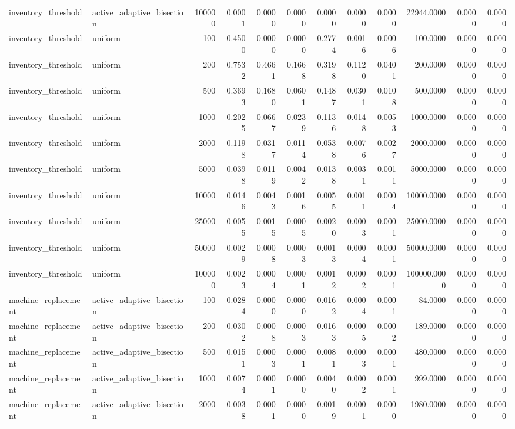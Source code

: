 \begin{tabular}{llrrrrrrrrrr}
inventory_threshold & active_adaptive_bisection & 100000 & 0.0001 & 0.0000 & 0.0000 & 0.0000 & 0.0000 & 0.0000 & 22944.0000 & 0.0000 & 0.0000 \\
inventory_threshold & uniform & 100 & 0.4500 & 0.0000 & 0.0000 & 0.2774 & 0.0016 & 0.0006 & 100.0000 & 0.0000 & 0.0000 \\
inventory_threshold & uniform & 200 & 0.7532 & 0.4661 & 0.1668 & 0.3198 & 0.1120 & 0.0401 & 200.0000 & 0.0000 & 0.0000 \\
inventory_threshold & uniform & 500 & 0.3693 & 0.1680 & 0.0601 & 0.1487 & 0.0301 & 0.0108 & 500.0000 & 0.0000 & 0.0000 \\
inventory_threshold & uniform & 1000 & 0.2025 & 0.0667 & 0.0239 & 0.1136 & 0.0148 & 0.0053 & 1000.0000 & 0.0000 & 0.0000 \\
inventory_threshold & uniform & 2000 & 0.1198 & 0.0317 & 0.0114 & 0.0538 & 0.0076 & 0.0027 & 2000.0000 & 0.0000 & 0.0000 \\
inventory_threshold & uniform & 5000 & 0.0398 & 0.0119 & 0.0042 & 0.0138 & 0.0031 & 0.0011 & 5000.0000 & 0.0000 & 0.0000 \\
inventory_threshold & uniform & 10000 & 0.0146 & 0.0043 & 0.0016 & 0.0055 & 0.0011 & 0.0004 & 10000.0000 & 0.0000 & 0.0000 \\
inventory_threshold & uniform & 25000 & 0.0055 & 0.0015 & 0.0005 & 0.0020 & 0.0003 & 0.0001 & 25000.0000 & 0.0000 & 0.0000 \\
inventory_threshold & uniform & 50000 & 0.0029 & 0.0008 & 0.0003 & 0.0013 & 0.0004 & 0.0001 & 50000.0000 & 0.0000 & 0.0000 \\
inventory_threshold & uniform & 100000 & 0.0023 & 0.0004 & 0.0001 & 0.0012 & 0.0002 & 0.0001 & 100000.0000 & 0.0000 & 0.0000 \\
machine_replacement & active_adaptive_bisection & 100 & 0.0284 & 0.0000 & 0.0000 & 0.0162 & 0.0004 & 0.0001 & 84.0000 & 0.0000 & 0.0000 \\
machine_replacement & active_adaptive_bisection & 200 & 0.0302 & 0.0008 & 0.0003 & 0.0163 & 0.0005 & 0.0002 & 189.0000 & 0.0000 & 0.0000 \\
machine_replacement & active_adaptive_bisection & 500 & 0.0151 & 0.0003 & 0.0001 & 0.0081 & 0.0003 & 0.0001 & 480.0000 & 0.0000 & 0.0000 \\
machine_replacement & active_adaptive_bisection & 1000 & 0.0074 & 0.0001 & 0.0000 & 0.0040 & 0.0002 & 0.0001 & 999.0000 & 0.0000 & 0.0000 \\
machine_replacement & active_adaptive_bisection & 2000 & 0.0038 & 0.0001 & 0.0000 & 0.0019 & 0.0001 & 0.0000 & 1980.0000 & 0.0000 & 0.0000 \\

\end{tabular}
